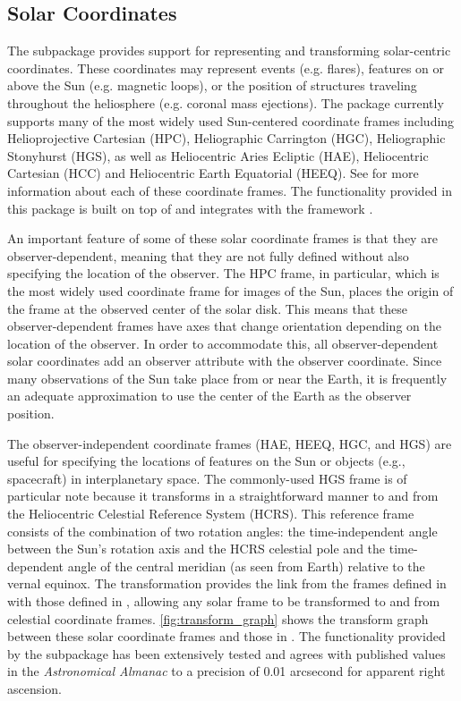 \subsection{Solar Coordinates}
\label{sec:coords}

The  subpackage provides support for representing and transforming solar-centric coordinates.
These coordinates may represent events (e.g. flares), features on or above the Sun (e.g. magnetic loops), or the position of structures traveling throughout the heliosphere (e.g. coronal mass ejections).
The package currently supports many of the most widely used Sun-centered coordinate frames including Helioprojective Cartesian (HPC), Heliographic Carrington (HGC), Heliographic Stonyhurst (HGS),  as well as Heliocentric Aries Ecliptic (HAE), Heliocentric Cartesian (HCC) and Heliocentric Earth Equatorial (HEEQ).
See \citet{2006A&A...449..791T} for more information about each of these coordinate frames.
The functionality provided in this package is built on top of and integrates with the  framework \citep[see Section 3.3 of][]{astropy2018}.

An important feature of some of these solar coordinate frames is that they are observer-dependent, meaning that they are not fully defined without also specifying the location of the observer.
The HPC frame, in particular, which is the most widely used coordinate frame for images of the Sun, places the origin of the frame at the observed center of the solar disk.
This means that these observer-dependent frames have axes that change orientation depending on the location of the observer.
In order to accommodate this, all observer-dependent solar coordinates add an observer attribute with the observer coordinate.
Since many observations of the Sun take place from or near the Earth, it is frequently an adequate approximation to use the center of the Earth as the observer position.

The observer-independent coordinate frames (HAE, HEEQ, HGC, and HGS) are useful for specifying the locations of features on the Sun or objects (e.g., spacecraft) in interplanetary space.
The commonly-used HGS frame is of particular note because it transforms in a straightforward manner to and from the Heliocentric Celestial Reference System (HCRS).
This reference frame consists of the combination of two rotation angles: the time-independent angle between the Sun's rotation axis and the HCRS celestial pole \citep[see][]{2007CeMDA..98..155S} and the time-dependent angle of the central meridian (as seen from Earth) relative to the vernal equinox.
The transformation provides the link from the frames defined in  with those defined in , allowing any solar frame to be transformed to and from celestial coordinate frames.
\autoref{fig:transform_graph} shows the transform graph between these solar coordinate frames and those in \astropy.
The functionality provided by the  subpackage has been extensively tested and agrees with published values in the \textit{Astronomical Almanac} to a precision of 0.01 arcsecond for apparent right ascension.

